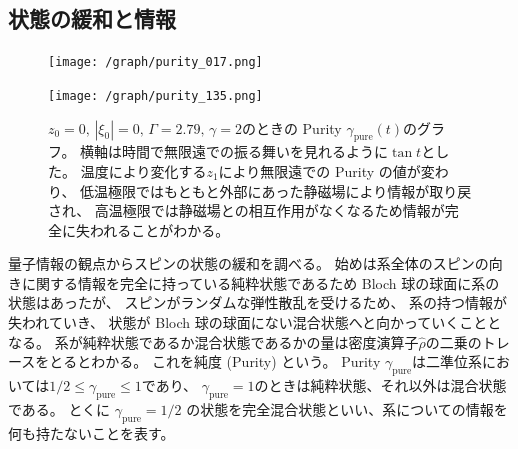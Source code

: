 \documentclass[11pt,dvipdfmx,a4paper]{jsarticle}
\begin{document}
\subsection{状態の緩和と情報}
\begin{figure}[htb]
	\centering
	\begin{minipage}[t]{0.48\columnwidth}
		\centering
		\texttt{[image: /graph/purity\_017.png]}
	\end{minipage}
	\hfill
	\begin{minipage}[t]{0.48\columnwidth}
		\centering
		\texttt{[image: /graph/purity\_135.png]}
	\end{minipage}
	\caption{\(z_0 = 0,\, |\xi_0|=0,\,\Gamma=2.79,\,\gamma=2\)のときの
	 Purity \(\gamma_{\text{pure}}(t)\)のグラフ。
	 横軸は時間で無限遠での振る舞いを見れるように\(\tan t\)とした。
	 温度により変化する\(z_{1}\)により無限遠での Purity の値が変わり、
	 低温極限ではもともと外部にあった静磁場により情報が取り戻され、
	 高温極限では静磁場との相互作用がなくなるため情報が完全に失われることがわかる。}
	 \label{graph:purity}
\end{figure}
量子情報の観点からスピンの状態の緩和を調べる。
始めは系全体のスピンの向きに関する情報を完全に持っている純粋状態であるため Bloch 球の球面に系の状態はあったが、
スピンがランダムな弾性散乱を受けるため、
系の持つ情報が失われていき、
状態が Bloch 球の球面にない混合状態へと向かっていくこととなる。
系が純粋状態であるか混合状態であるかの量は密度演算子\(\hat{\rho}\)の二乗のトレースをとるとわかる。
これを純度 (Purity) という。
 Purity \(\gamma_{\text{pure}}\)は二準位系においては\(1/2 \leq \gamma_{\text{pure}}\leq 1\)であり、
\(\gamma_{\text{pure}} = 1\)のときは純粋状態、それ以外は混合状態である。
とくに \(\gamma_{\text{pure}}=1/2\) の状態を完全混合状態といい、系についての情報を何も持たないことを表す。
\end{document}

